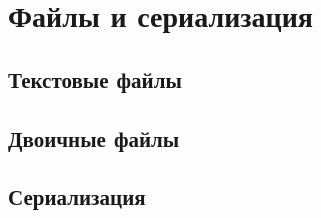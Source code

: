 \section{Файлы и сериализация}

\subsection{Текстовые файлы}

\subsection{Двоичные файлы}

\subsection{Сериализация}
